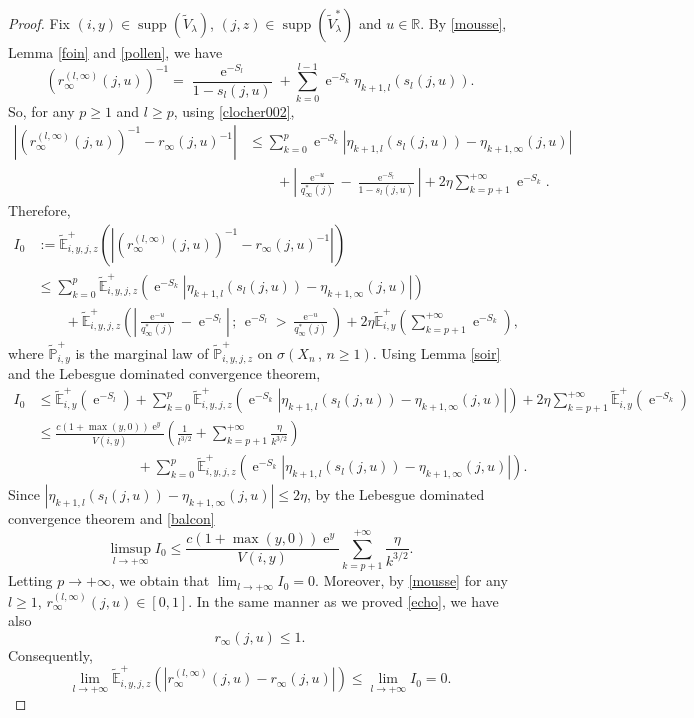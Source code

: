 \documentclass[12pt]{amsart}
\theoremstyle{definition}
\numberwithin{equation}{section}
\newcommand*{\abs}[1]{\left\lvert#1\right\rvert}
\def\bb#1{\mathbb{#1}}
\def\tt#1{\tilde{#1}}
\def\tbb#1{\tilde{\mathbb{#1}}}
\def\geq{\geqslant}
\def\leq{\leqslant}
\renewcommand\ll{\lambda}
\DeclareMathOperator{\e}{e}
\DeclareMathOperator{\supp}{supp}
\begin{document}
\begin{proof}
Fix $(i,y) \in \supp \left( \tt V_{\ll} \right)$, $(j,z) \in \supp \left( \tt V_{\ll}^* \right)$ and $u \in \bb R$. By \eqref{mousse}, Lemma \ref{foin} and \eqref{pollen}, we have
\[
\left( r_{\infty}^{(l,\infty)}(j,u) \right)^{-1} = \frac{\e^{-S_l}}{1-s_l(j,u)} + \sum_{k=0}^{l-1} \e^{-S_k} \eta_{k+1,l}(s_l(j,u)).
\]
So, for any $p \geq 1$ and $l \geq p$, using \eqref{clocher002},
\begin{align*}
\abs{\left( r_{\infty}^{(l,\infty)}(j,u) \right)^{-1} - r_{\infty}(j,u)^{-1}} &\leq  \sum_{k=0}^{p} \e^{-S_k} \abs{\eta_{k+1,l}(s_l(j,u)) - \eta_{k+1,\infty}(j,u)} \\
&\qquad + \abs{\frac{\e^{-u}}{q_{\infty}^*(j)} - \frac{\e^{-S_l}}{1-s_l(j,u)}} + 2\eta \sum_{k=p+1}^{+\infty} \e^{-S_k}.
\end{align*}
Therefore, 
\begin{align*}
	I_0 &:= \tbb E_{i,y,j,z}^+ \left( \abs{\left( r_{\infty}^{(l,\infty)}(j,u) \right)^{-1} - r_{\infty}(j,u)^{-1}} \right) \\
	&\leq \sum_{k=0}^{p} \tbb E_{i,y,j,z}^+ \left( \e^{-S_k} \abs{\eta_{k+1,l}(s_l(j,u)) - \eta_{k+1,\infty}(j,u)} \right) \\
	&\qquad+ \tbb E_{i,y,j,z}^+ \left( \abs{\frac{\e^{-u}}{q_{\infty}^*(j)} - \e^{-S_l}} \,;\, \e^{-S_l} > \frac{\e^{-u}}{q_{\infty}^*(j)} \right) + 2\eta \tbb E_{i,y}^+ \left( \sum_{k=p+1}^{+\infty} \e^{-S_k} \right),
\end{align*}
where $\tbb P_{i,y}^+$ is the marginal law of $\tbb P_{i,y,j,z}^+$ on $\sigma\left( X_n \,,\, n \geq 1 \right)$. Using Lemma \ref{soir} and the Lebesgue dominated convergence theorem,
\begin{align*}
	I_0 &\leq \tbb E_{i,y}^+ \left( \e^{-S_l} \right) + \sum_{k=0}^{p} \tbb E_{i,y,j,z}^+ \left( \e^{-S_k} \abs{\eta_{k+1,l}\left(s_l(j,u)\right) - \eta_{k+1,\infty}(j,u)} \right) + 2\eta \sum_{k=p+1}^{+\infty} \tbb E_{i,y}^+ \left( \e^{-S_k} \right) \\
	&\leq \frac{c \left( 1+\max(y,0) \right)\e^{y}}{V(i,y)} \left( \frac{1}{l^{3/2}} + \sum_{k=p+1}^{+\infty} \frac{\eta}{k^{3/2}} \right) \\
	&\hspace{3cm} + \sum_{k=0}^{p} \tbb E_{i,y,j,z}^+ \left( \e^{-S_k} \abs{\eta_{k+1,l}(s_l(j,u)) - \eta_{k+1,\infty}(j,u)} \right).
\end{align*}
Since $\abs{\eta_{k+1,l}(s_l(j,u)) - \eta_{k+1,\infty}(j,u)} \leq 2\eta$, by the Lebesgue dominated convergence theorem and \eqref{balcon}
\[
\limsup_{l\to+\infty} I_0 \leq \frac{c \left( 1+\max(y,0) \right)\e^{y}}{V(i,y)} \sum_{k=p+1}^{+\infty} \frac{\eta}{k^{3/2}}.
\]
Letting $p \to +\infty$, we obtain that $\lim_{l\to+\infty} I_0 = 0$. Moreover, by \eqref{mousse} for any $l \geq 1$, $r_{\infty}^{(l,\infty)}(j,u)  \in [0,1]$. In the same manner as we proved \eqref{echo}, we have also
\[
r_{\infty}(j,u) \leq 1.
\]
Consequently,
\[
\lim_{l\to +\infty} \tbb E_{i,y,j,z}^+ \left( \abs{r_{\infty}^{(l,\infty)}(j,u) - r_{\infty}(j,u)} \right) \leq \lim_{l\to+\infty} I_0 = 0.
\]
\end{proof}
\end{document}
